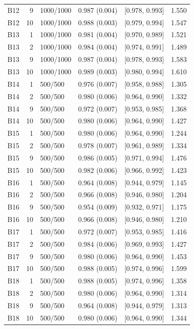 \begin{longtable}[t]{lrllll}
B12 & 9 & 1000/1000 & 0.987 (0.004) & {}[0.978, 0.993] & 1.550\\
B12 & 10 & 1000/1000 & 0.988 (0.003) & {}[0.979, 0.994] & 1.547\\
B13 & 1 & 1000/1000 & 0.981 (0.004) & {}[0.970, 0.989] & 1.521\\
B13 & 2 & 1000/1000 & 0.984 (0.004) & {}[0.974, 0.991] & 1.489\\
B13 & 9 & 1000/1000 & 0.987 (0.004) & {}[0.978, 0.993] & 1.583\\
B13 & 10 & 1000/1000 & 0.989 (0.003) & {}[0.980, 0.994] & 1.610\\
B14 & 1 & 500/500 & 0.976 (0.007) & {}[0.958, 0.988] & 1.305\\
B14 & 2 & 500/500 & 0.980 (0.006) & {}[0.964, 0.990] & 1.332\\
B14 & 9 & 500/500 & 0.972 (0.007) & {}[0.953, 0.985] & 1.368\\
B14 & 10 & 500/500 & 0.980 (0.006) & {}[0.964, 0.990] & 1.427\\
B15 & 1 & 500/500 & 0.980 (0.006) & {}[0.964, 0.990] & 1.244\\
B15 & 2 & 500/500 & 0.978 (0.007) & {}[0.961, 0.989] & 1.334\\
B15 & 9 & 500/500 & 0.986 (0.005) & {}[0.971, 0.994] & 1.476\\
B15 & 10 & 500/500 & 0.982 (0.006) & {}[0.966, 0.992] & 1.423\\
B16 & 1 & 500/500 & 0.964 (0.008) & {}[0.944, 0.979] & 1.145\\
B16 & 2 & 500/500 & 0.966 (0.008) & {}[0.946, 0.980] & 1.204\\
B16 & 9 & 500/500 & 0.954 (0.009) & {}[0.932, 0.971] & 1.175\\
B16 & 10 & 500/500 & 0.966 (0.008) & {}[0.946, 0.980] & 1.210\\
B17 & 1 & 500/500 & 0.972 (0.007) & {}[0.953, 0.985] & 1.416\\
B17 & 2 & 500/500 & 0.984 (0.006) & {}[0.969, 0.993] & 1.427\\
B17 & 9 & 500/500 & 0.980 (0.006) & {}[0.964, 0.990] & 1.453\\
B17 & 10 & 500/500 & 0.988 (0.005) & {}[0.974, 0.996] & 1.599\\
B18 & 1 & 500/500 & 0.988 (0.005) & {}[0.974, 0.996] & 1.358\\
B18 & 2 & 500/500 & 0.980 (0.006) & {}[0.964, 0.990] & 1.314\\
B18 & 9 & 500/500 & 0.964 (0.008) & {}[0.944, 0.979] & 1.313\\
B18 & 10 & 500/500 & 0.980 (0.006) & {}[0.964, 0.990] & 1.344\\

\end{longtable}
